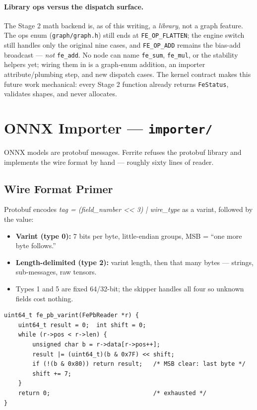 \documentclass[11pt,a4paper]{article}
\begin{document}
\paragraph{Library ops versus the dispatch surface.} The Stage 2 math backend
is, as of this writing, a \emph{library}, not a graph feature. The ops enum
(\texttt{graph/graph.h}) still ends at \texttt{FE\_OP\_FLATTEN};
the engine switch still handles only the original nine cases, and
\texttt{FE\_OP\_ADD} remains the bias-add broadcast --- \emph{not}
\texttt{fe\_add}. No node can name \texttt{fe\_sum}, \texttt{fe\_mul}, or the
stability helpers yet; wiring them in is a graph-enum addition, an importer
attribute/plumbing step, and new dispatch cases. The kernel contract makes this
future work mechanical: every Stage 2 function already returns
\texttt{FeStatus}, validates shapes, and never allocates.

\section{ONNX Importer --- \texttt{importer/}}

ONNX models are protobuf messages. Ferrite refuses the protobuf library and
implements the wire format by hand --- roughly sixty lines of reader.

\subsection{Wire Format Primer}

Protobuf encodes \emph{tag = (field\_number << 3) | wire\_type} as a varint,
followed by the value:

\begin{itemize}[itemsep=1pt]
\item \textbf{Varint (type 0):} 7 bits per byte, little-endian groups, MSB =
      ``one more byte follows.''
\item \textbf{Length-delimited (type 2):} varint length, then that many bytes
      --- strings, sub-messages, raw tensors.
\item Types 1 and 5 are fixed 64/32-bit; the skipper handles all four so
      unknown fields cost nothing.
\end{itemize}

\begin{lstlisting}[style=cstyle,caption={importer/onnx.c --- the complete varint decoder}]
uint64_t fe_pb_varint(FePbReader *r) {
    uint64_t result = 0;  int shift = 0;
    while (r->pos < r->len) {
        unsigned char b = r->data[r->pos++];
        result |= (uint64_t)(b & 0x7F) << shift;
        if (!(b & 0x80)) return result;   /* MSB clear: last byte */
        shift += 7;
    }
    return 0;                             /* exhausted */
}
\end{lstlisting}
\end{document}
